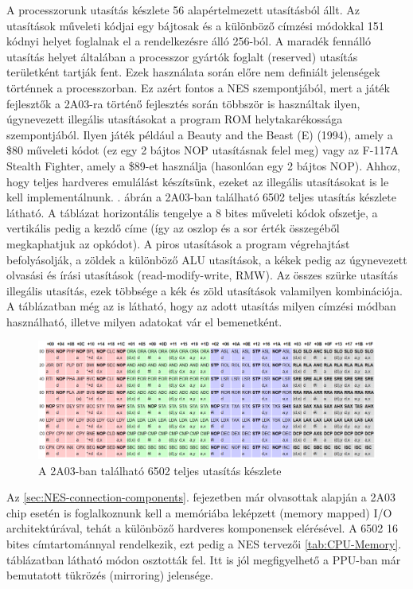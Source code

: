 	A processzorunk utasítás készlete 56 alapértelmezett utasításból állt. Az utasítások műveleti kódjai egy bájtosak és a különböző címzési módokkal 151 kódnyi helyet foglalnak el a rendelkezésre álló 256-ból. A maradék fennálló utasítás helyet általában a processzor gyártók foglalt (reserved) utasítás területként tartják fent. Ezek használata során előre nem definiált jelenségek történnek a processzorban. Ez azért fontos a NES szempontjából, mert a játék fejlesztők a 2A03-ra történő fejlesztés során többször is használtak ilyen, úgynevezett illegális utasításokat a program ROM helytakarékossága szempontjából. Ilyen játék például a Beauty and the Beast (E) (1994), amely a \$80 műveleti kódot (ez egy 2 bájtos NOP utasításnak felel meg) vagy az F-117A Stealth Fighter, amely a \$89-et használja (hasonlóan egy 2 bájtos NOP). Ahhoz, hogy teljes hardveres emulálást készítsünk, ezeket az illegális utasításokat is le kell implementálnunk. . ábrán a 2A03-ban található 6502 teljes utasítás készlete látható. A táblázat horizontális tengelye a 8 bites műveleti kódok ofszetje, a vertikális pedig a kezdő címe (így az oszlop és a sor érték összegéből megkaphatjuk az opkódot). A piros utasítások a program végrehajtást befolyásolják, a zöldek a különböző ALU utasítások, a kékek pedig az úgynevezett olvasási és írási utasítások (read-modify-write, RMW). Az összes szürke utasítás illegális utasítás, ezek többsége a kék és zöld utasítások valamilyen kombinációja. A táblázatban még az is látható, hogy az adott utasítás milyen címzési módban használható, illetve milyen adatokat vár el bemenetként.
	
	\begin{figure}[H]
		\centering
		\includegraphics[width=150mm, keepaspectratio]{figures/2A03-opcodes}
		\caption{A 2A03-ban található 6502 teljes utasítás készlete \cite{NESdev_6502_opcodes}}
		\label{fig:2A03-Opcodes}
	\end{figure}
	
	Az \ref{sec:NES-connection-components}. fejezetben már olvasottak alapján a 2A03 chip esetén is foglalkoznunk kell a memóriába leképzett (memory mapped) I/O architektúrával, tehát a különböző hardveres komponensek elérésével. A 6502 16 bites címtartománnyal rendelkezik, ezt pedig a NES tervezői \ref{tab:CPU-Memory}. táblázatban látható módon osztották fel. Itt is jól megfigyelhető a PPU-ban már bemutatott tükrözés (mirroring) jelensége.
	
